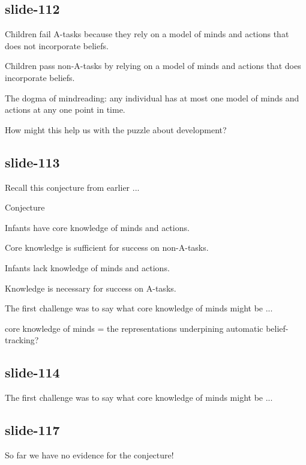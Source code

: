 \documentclass[12pt,\papersize]{extarticle}
\begin{document}
\subsection{slide-112}
Children fail A-tasks
because they rely on a model of minds and actions that does not incorporate beliefs.

Children pass non-A-tasks
by relying on a model of minds and actions that does incorporate beliefs.

The dogma of mindreading: any individual has at most one model of minds and actions
at any one point in time.

How might this help us with the puzzle about development?

\subsection{slide-113}
Recall this conjecture from earlier ...

Conjecture





 Infants have core knowledge of minds and actions.



Core knowledge is sufficient for success on non-A-tasks.



 Infants lack knowledge of minds and actions.



 Knowledge is necessary for success on A-tasks.











The first challenge was to say what core knowledge of minds might be ...









core knowledge of minds = the representations underpining automatic belief-tracking?




\subsection{slide-114}
The first challenge was to say what core knowledge of minds might be ...

\subsection{slide-117}
So far we have no evidence for the conjecture!
\end{document}
